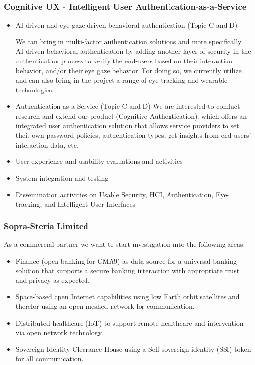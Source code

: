 \documentclass[a4paper,11pt]{article}
\begin{document}
\subsubsection{Cognitive UX - Intelligent User Authentication-as-a-Service}
\begin{itemize}
\item AI-driven and eye gaze-driven behavioral authentication (Topic C and D)

We can bring in multi-factor authentication solutions and more specifically AI-driven behavioral authentication by adding another layer of security in the authentication process to verify the end-users based on their interaction behavior, and/or their eye gaze behavior. For doing so, we currently utilize and can also bring in the project a range of eye-tracking and wearable technologies.

\item Authentication-as-a-Service (Topic C and D)
We are interested to conduct research and extend our product (Cognitive Authentication), which offers an integrated user authentication solution that allows service providers to set their own password policies, authentication types, get insights from end-users' interaction data, etc.

\item User experience and usability evaluations and activities
\item System integration and testing
\item Dissemination activities on Usable Security, HCI, Authentication, Eye-tracking, and Intelligent User Interfaces
\end{itemize}

\subsubsection{Sopra-Steria Limited}

As a commercial partner we want to start investigation into the following areas:
\begin{itemize}
    \item Finance (open banking for CMA9) as data source for a universal banking solution that supports a secure banking interaction with appropriate trust and privacy as expected.
    \item Space-based open Internet capabilities using low Earth orbit satellites and therefor using an open meshed network for communication.
    \item Distributed healthcare (IoT) to support remote healthcare and intervention via open network technology.
    \item Sovereign Identity Clearance House using a Self-sovereign identity (SSI) token for all communication.
\end{itemize}
\end{document}
